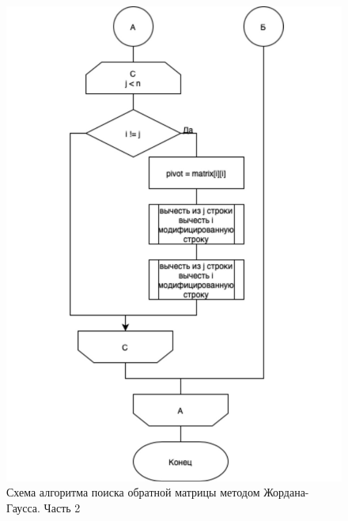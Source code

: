 \begin{figure}[h]
    \centering
    \includegraphics[width=0.9\linewidth]{img/gauss2.pdf}
    \caption{Схема алгоритма поиска обратной матрицы методом Жордана-Гаусса. Часть 2}
    \label{fig:gauss2}
\end{figure}

